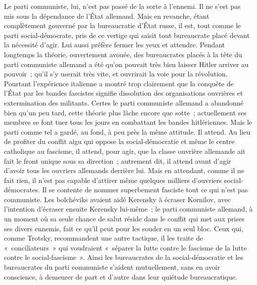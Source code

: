 \documentclass[french,twoside]{book} %
\begin{document}
Le parti communiste, lui, n'est pas passé de la sorte à l'ennemi. Il ne s'est pas mis sous la dépendance de l'État allemand. Mais en revanche, étant complètement gouverné par la bureaucratie d'État russe, il est, tout comme le parti social-démocrate, pris de ce vertige qui saisit tout bureaucrate placé devant la nécessité d'agir. Lui aussi préfère fermer les yeux et attendre. Pendant longtemps la théorie, ouvertement avouée, des bureaucrates placés à la tête du parti communiste allemand a été qu'on pouvait très bien laisser Hitler arriver au pouvoir ; qu'il s'y userait très vite, et ouvrirait la voie pour la révolution. Pourtant l'expérience italienne a montré trop clairement que la conquête de l'État par les bandes fascistes signifie dissolution des organisa­tions ouvrières et extermination des militants. Certes le parti communiste allemand a abandonné bien qu'un peu tard, cette théorie plus lâche encore que sotte ; actuellement ses membres se font tuer tous les jours en combattant les bandes hitlériennes. Mais le parti comme tel a gardé, au fond, à peu près la même attitude. Il attend. Au lieu de profiter du conflit aigu qui oppose la social-démocratie et même le centre catholique au fascisme, il attend, pour agir, que la classe ouvrière allemande ait fait le front unique sous sa direction ; autrement dit, il attend avant d'agir d'avoir tous les ouvriers allemands derrière lui. Mais en attendant, comme il ne fait rien, il n'est pas capable d'attirer même quelques milliers d'ouvriers social-démocrates. Il se contente de nommer superbement fasciste tout ce qui n'est pas communiste. Les bolchéviks avaient aidé Kerensky à écraser Kornilov, avec l'intention d'écraser ensuite Kerensky lui-même ; le parti communiste allemand, à un moment où sa seule chance de salut réside dans le conflit qui met aux prises ses divers ennemis, fait ce qu'il peut pour les souder en un seul bloc. Ceux qui, comme Trotsky, recomman­dent une autre tactique, il les traite de « conciliateurs » qui voudraient « sépa­rer la lutte contre le fascisme de la lutte contre le social-fascisme ». Ainsi les bureaucrates de la social-démocratie et les bureaucrates du parti communiste s'aident mutuellement, sans en avoir conscience, à demeurer de part et d'autre dans leur quiétude bureaucratique.\par
\end{document}
